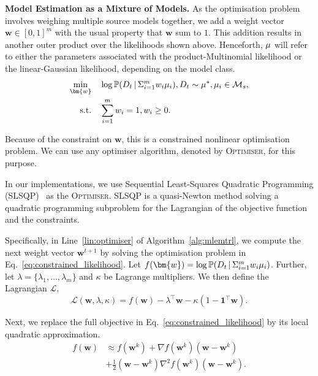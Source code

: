 \noindent\textbf{Model Estimation as a Mixture of Models.}
As the optimisation problem involves weighing multiple source models together, we add a weight vector $\bm{w} \in [0, 1]^{m}$ with the usual property that $\bm{w}$ sum to $1$. This addition results in another outer product over the likelihoods shown above. Henceforth, $\mu$ will refer to either the parameters associated with the product-Multinomial likelihood or the linear-Gaussian likelihood, depending on the model class.
\begin{equation}\label{eq:constrained_likelihood}
\begin{aligned}
\underset{\bm{w}}{\min} \quad &\log \mathbb{P}(D_t \, | \, \Sigma_{i=1}^m w_i \mdp_i), D_t \sim \mdp^{*}, \mdp_i\in\mathcal{M}_s,\\
\textrm{s.t.} \quad & \sum_{i=1}^m w_i = 1, w_i\geq0.\\
\end{aligned}
\end{equation}

Because of the constraint on $\bm{w}$, this is a constrained nonlinear optimisation problem. We can use any optimiser algorithm, denoted by \textsc{Optimiser}, for this purpose.

 In our implementations, we use Sequential Least-Squares Quadratic Programming (SLSQP)~\citep{kraft1988software} as the \textsc{Optimiser}. SLSQP is a quasi-Newton method solving a quadratic programming subproblem for the Lagrangian of the objective function and the constraints.

Specifically, in Line~\ref{lin:optimiser} of Algorithm~\ref{alg:mlemtrl}, we compute the next weight vector $\bm{w}^{t+1}$ by solving the optimisation problem in Eq.~\ref{eq:constrained_likelihood}. Let $f(\bm{w}) = \log \mathbb{P}(D_t \, | \, \Sigma_{i=1}^m w_i \mdp_i)$. Further, let $\lambda=\{\lambda_1,\hdots,\lambda_m\}$ and $\kappa$ be Lagrange multipliers. We then define the Lagrangian $\mathcal{L},$
\begin{equation}
    \mathcal{L}(\bm{w}, \lambda,\kappa) = f(\bm{w})-\lambda^\top\bm{w}-\kappa(1-\mathbf{1}^\top\bm{w}).
\end{equation}

Next, we replace the full objective in Eq.~\ref{eq:constrained_likelihood} by its local quadratic approximation.
\begin{equation}
\begin{aligned}
    f(\bm{w}) &\approx f(\bm{w}^k)+\nabla f(\bm{w}^k)(\bm{w}-\bm{w}^k)\\&+\frac{1}{2}(\bm{w}-\bm{w}^k)\nabla^2f(\bm{w}^k)(\bm{w}-\bm{w}^k).
\end{aligned}
\end{equation}

